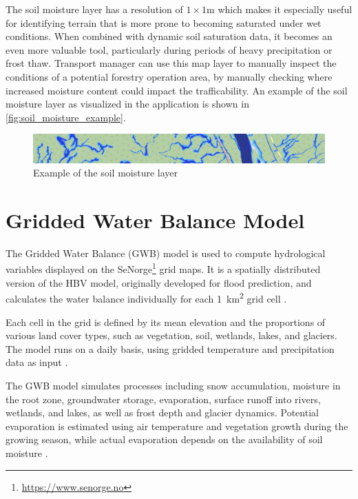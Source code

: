 The soil moisture layer has a resolution of $1 \times 1$m which makes it especially useful for identifying terrain that is more prone to becoming saturated under wet conditions. When combined with dynamic soil saturation data, it becomes an even more valuable tool, particularly during periods of heavy precipitation or frost thaw. Transport manager can use this map layer to manually inspect the conditions of a potential forestry operation area, by manually checking where increased moisture content could impact the trafficability. An example of the soil moisture layer as visualized in the application is shown in \autoref{fig:soil_moisture_example}.

\begin{figure}[h]
    \centering
    \includegraphics[width=1\linewidth]{images/maplayers/markfuktighet.png}
    \caption{Example of the soil moisture layer}
    \label{fig:soil_moisture_example}
\end{figure}

\section{Gridded Water Balance Model}

The Gridded Water Balance (GWB) model is used to compute hydrological variables displayed on the SeNorge\footnote{\url{https://www.senorge.no}} grid maps. It is a spatially distributed version of the HBV model, originally developed for flood prediction, and calculates the water balance individually for each \qty{1}{\kilo\meter\squared} grid cell \cite{nve2025waterdata}.

Each cell in the grid is defined by its mean elevation and the proportions of various land cover types, such as vegetation, soil, wetlands, lakes, and glaciers. The model runs on a daily basis, using gridded temperature and precipitation data as input \cite{nve2025waterdata}.

The GWB model simulates processes including snow accumulation, moisture in the root zone, groundwater storage, evaporation, surface runoff into rivers, wetlands, and lakes, as well as frost depth and glacier dynamics. Potential evaporation is estimated using air temperature and vegetation growth during the growing season, while actual evaporation depends on the availability of soil moisture \cite{nve2025waterdata}.

